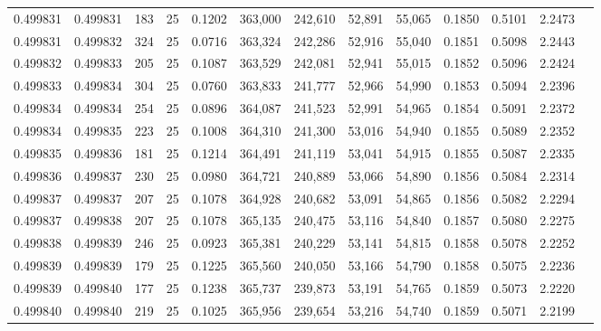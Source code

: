 \begin{tabular}{rrrrrrrrrrrrr}
0.499831 & 0.499831 & 183 &  25 &                                     0.1202 & 363,000 & 242,610 &  52,891 &  55,065 & 0.1850 & 0.5101 & 2.2473 \\
0.499831 & 0.499832 & 324 &  25 &                                     0.0716 & 363,324 & 242,286 &  52,916 &  55,040 & 0.1851 & 0.5098 & 2.2443 \\
0.499832 & 0.499833 & 205 &  25 &                                     0.1087 & 363,529 & 242,081 &  52,941 &  55,015 & 0.1852 & 0.5096 & 2.2424 \\
0.499833 & 0.499834 & 304 &  25 &                                     0.0760 & 363,833 & 241,777 &  52,966 &  54,990 & 0.1853 & 0.5094 & 2.2396 \\
0.499834 & 0.499834 & 254 &  25 &                                     0.0896 & 364,087 & 241,523 &  52,991 &  54,965 & 0.1854 & 0.5091 & 2.2372 \\
0.499834 & 0.499835 & 223 &  25 &                                     0.1008 & 364,310 & 241,300 &  53,016 &  54,940 & 0.1855 & 0.5089 & 2.2352 \\
0.499835 & 0.499836 & 181 &  25 &                                     0.1214 & 364,491 & 241,119 &  53,041 &  54,915 & 0.1855 & 0.5087 & 2.2335 \\
0.499836 & 0.499837 & 230 &  25 &                                     0.0980 & 364,721 & 240,889 &  53,066 &  54,890 & 0.1856 & 0.5084 & 2.2314 \\
0.499837 & 0.499837 & 207 &  25 &                                     0.1078 & 364,928 & 240,682 &  53,091 &  54,865 & 0.1856 & 0.5082 & 2.2294 \\
0.499837 & 0.499838 & 207 &  25 &                                     0.1078 & 365,135 & 240,475 &  53,116 &  54,840 & 0.1857 & 0.5080 & 2.2275 \\
0.499838 & 0.499839 & 246 &  25 &                                     0.0923 & 365,381 & 240,229 &  53,141 &  54,815 & 0.1858 & 0.5078 & 2.2252 \\
0.499839 & 0.499839 & 179 &  25 &                                     0.1225 & 365,560 & 240,050 &  53,166 &  54,790 & 0.1858 & 0.5075 & 2.2236 \\
0.499839 & 0.499840 & 177 &  25 &                                     0.1238 & 365,737 & 239,873 &  53,191 &  54,765 & 0.1859 & 0.5073 & 2.2220 \\
0.499840 & 0.499840 & 219 &  25 &                                     0.1025 & 365,956 & 239,654 &  53,216 &  54,740 & 0.1859 & 0.5071 & 2.2199 \\

\end{tabular}

